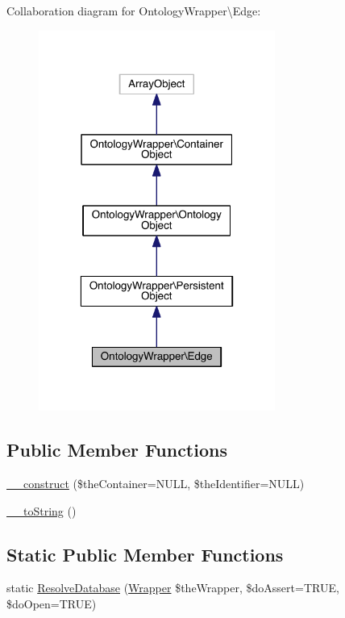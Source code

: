 Collaboration diagram for Ontology\-Wrapper\textbackslash{}Edge\-:
\nopagebreak
\begin{figure}[H]
\begin{center}
\leavevmode
\includegraphics[width=220pt]{class_ontology_wrapper_1_1_edge__coll__graph}
\end{center}
\end{figure}
\subsection*{Public Member Functions}
\begin{DoxyCompactItemize}
\item 
\hyperlink{class_ontology_wrapper_1_1_edge_ae3ae5e6b59244535718879a98e4b16d3}{\-\_\-\-\_\-construct} (\$the\-Container=N\-U\-L\-L, \$the\-Identifier=N\-U\-L\-L)
\item 
\hyperlink{class_ontology_wrapper_1_1_edge_a3e43824f150d9615a32dead203b46f07}{\-\_\-\-\_\-to\-String} ()
\end{DoxyCompactItemize}
\subsection*{Static Public Member Functions}
\begin{DoxyCompactItemize}
\item 
static \hyperlink{class_ontology_wrapper_1_1_edge_a7736dd49a14aa9e4353be707e77d4b11}{Resolve\-Database} (\hyperlink{class_ontology_wrapper_1_1_wrapper}{Wrapper} \$the\-Wrapper, \$do\-Assert=T\-R\-U\-E, \$do\-Open=T\-R\-U\-E)
\end{DoxyCompactItemize}
